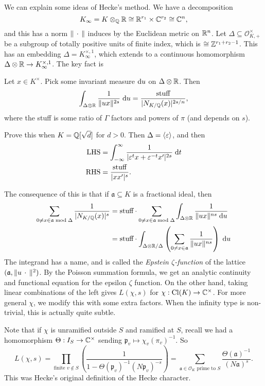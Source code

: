 \documentclass[a4paper]{article}
\DeclareMathOperator\Cl{\mathrm{Cl}}
\begin{document}
We can explain some ideas of Hecke's method. We have a decomposition
\[
  K_\infty =K \otimes_{\mathbb{Q}} \mathbb{R} \cong \mathbb{R}^{r_1} \times \mathbb{C}^{r_2} \cong \mathbb{C}^n,
\]
and this has a norm $\|\,\cdot\,\|$ induces by the Euclidean metric on $\mathbb{R}^n$. Let $\Delta \subseteq \mathcal{O}_{K, +}^\times$ be a subgroup of totally positive units of finite index, which is $\cong \mathbb{Z}^{r_1 + r_2 - 1}$. This has an embedding $\Delta = K_\infty^{\times, 1}$, which extends to a continuous homomorphism $\Delta \otimes \mathbb{R} \to K_\infty^{\times, 1}$. The key fact is
\begin{prop}
  Let $x \in K^\times$. Pick some invariant measure $\mathrm{d} u$ on $\Delta \otimes \mathbb{R}$. Then
  \[
    \int_{\Delta \otimes \mathbb{R}} \frac{1}{\|ux\|^{2s}} \;\mathrm{d} u = \frac{\text{stuff}}{|N_{K/\mathbb{Q}}(x)|^{2s/n}},
  \]
  where the stuff is some ratio of $\Gamma$ factors and powers of $\pi$ (and depends on $s$).
\end{prop}
\begin{ex}
  Prove this when $K = \mathbb{Q}[\sqrt{d}]$ for $d > 0$. Then $\Delta = \langle \varepsilon\rangle$, and then
  \begin{align*}
    \text{LHS} &= \int_{-\infty}^\infty \frac{1}{|\varepsilon^t x + \varepsilon^{-t} x'|^{2s}}\;\mathrm{d} t\\
    \text{RHS} &= \frac{\text{stuff}}{|xx'|^s}.
  \end{align*}
\end{ex}
The consequence of this is that if $\mathfrak{a} \subseteq K$ is a fractional ideal, then
\begin{align*}
  \sum_{0 \not= x \in \mathfrak{a}\bmod \Delta} \frac{1}{|N_{K/\mathbb{Q}}(x)|^s} &= \text{stuff} \cdot \sum_{0 \not= x \in \mathfrak{a}\bmod \Delta} \int_{\Delta \otimes \mathbb{R}} \frac{1}{\|u x\|^{ns}\;\mathrm{d} u}\\
  &= \text{stuff} \cdot \int_{\Delta \otimes \mathbb{R}/\Delta} \left(\sum_{0 \not= x \in \mathfrak{a}} \frac{1}{\|u x\|^{ns}}\right)\;\mathrm{d} u
\end{align*}
The integrand has a name, and is called the \emph{Epstein $\zeta$-function} of the lattice $(\mathfrak{a}, \|u\,\cdot\,\|^2)$. By the Poisson summation formula, we get an analytic continuity and functional equation for the epsilon $\zeta$ function. On the other hand, taking linear combinations of the left gives $L(\chi, s)$ for $\chi: \Cl(K) \to \C^\times$. For more general $\chi$, we modify this with some extra factors. When the infinity type is non-trivial, this is actually quite subtle.

Note that if $\chi$ is unramified outside $S$ and ramified at $S$, recall we had a homomorphism $\Theta: I_S \to \mathbb{C}^\times$ sending $\mathfrak{p}_v \mapsto \chi_v(\pi_v)^{-1}$. So
\[
  L(\chi, s) = \prod_{\text{finite }v \not \in S} \left(\frac{1}{1 - \Theta(\mathfrak{p}_v)^{-1} (N\mathfrak{p}_v)^{-s}}\right) = \sum_{\mathfrak{a} \in \mathcal{O}_K\text{ prime to }S} \frac{\Theta(\mathfrak{a})^{-1}}{(N\mathfrak{a})^s}.
\]
This was Hecke's original definition of the Hecke character.
\end{document}
